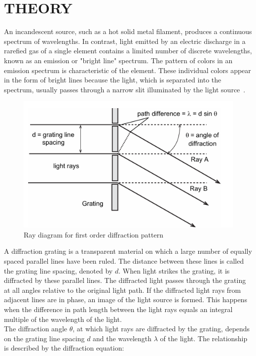 \documentclass[a4paper,11pt]{article}
\begin{document}
\newpage
\section*{\center THEORY}
\label{sec:THEORY}

\qquad An incandescent source, such as a hot solid metal filament, produces a continuous spectrum of wavelengths. In contrast, light emitted by an electric discharge in a rarefied gas of a single element contains a limited number of discrete wavelengths, known as an emission or "bright line" spectrum. The pattern of colors in an emission spectrum is characteristic of the element. These individual colors appear in the form of bright lines because the light, which is separated into the spectrum, usually passes through a narrow slit illuminated by the light source~\cite{pasco_spectrophotometer_manual}.\\

\begin{figure}[H]
  \centering
  \includegraphics[width=0.5 \linewidth]{image1.png}
  \caption{Ray diagram for first order diffraction pattern}
  \label{image1}
\end{figure}

A diffraction grating is a transparent material on which a large number of equally spaced parallel lines have been ruled. The distance between these lines is called the grating line spacing, denoted by \(d\). When light strikes the grating, it is diffracted by these parallel lines. The diffracted light passes through the grating at all angles relative to the original light path. If the diffracted light rays from adjacent lines are in phase, an image of the light source is formed. This happens when the difference in path length between the light rays equals an integral multiple of the wavelength of the light.\\

The diffraction angle \( \theta \), at which light rays are diffracted by the grating, depends on the grating line spacing \(d\) and the wavelength \( \lambda \) of the light. The relationship is described by the diffraction equation:
\end{document}
